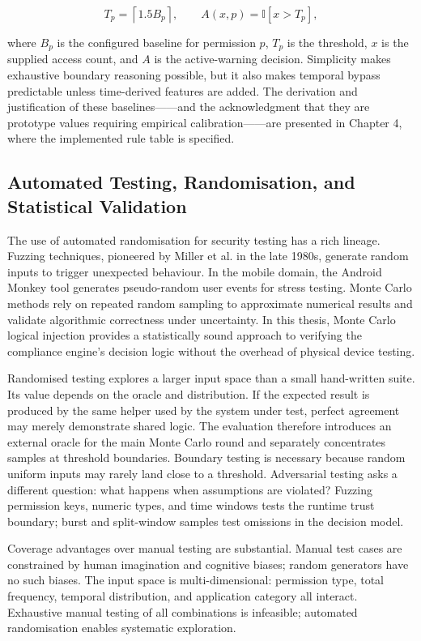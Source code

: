 \begin{equation}
T_p=\left\lceil 1.5B_p \right\rceil,\qquad
A(x,p)=\mathbb{I}[x>T_p],
\end{equation}

where $B_p$ is the configured baseline for permission $p$, $T_p$ is the threshold, $x$ is the supplied access count, and $A$ is the active-warning decision. Simplicity makes exhaustive boundary reasoning possible, but it also makes temporal bypass predictable unless time-derived features are added. The derivation and justification of these baselines——and the acknowledgment that they are prototype values requiring empirical calibration——are presented in Chapter 4, where the implemented rule table is specified.

\subsection{Automated Testing, Randomisation, and Statistical Validation}

The use of automated randomisation for security testing has a rich lineage. Fuzzing techniques, pioneered by Miller et al. in the late 1980s, generate random inputs to trigger unexpected behaviour. In the mobile domain, the Android Monkey tool generates pseudo-random user events for stress testing. Monte Carlo methods rely on repeated random sampling to approximate numerical results and validate algorithmic correctness under uncertainty. In this thesis, Monte Carlo logical injection provides a statistically sound approach to verifying the compliance engine's decision logic without the overhead of physical device testing.

Randomised testing explores a larger input space than a small hand-written suite. Its value depends on the oracle and distribution. If the expected result is produced by the same helper used by the system under test, perfect agreement may merely demonstrate shared logic. The evaluation therefore introduces an external oracle for the main Monte Carlo round and separately concentrates samples at threshold boundaries. Boundary testing is necessary because random uniform inputs may rarely land close to a threshold. Adversarial testing asks a different question: what happens when assumptions are violated? Fuzzing permission keys, numeric types, and time windows tests the runtime trust boundary; burst and split-window samples test omissions in the decision model.

Coverage advantages over manual testing are substantial. Manual test cases are constrained by human imagination and cognitive biases; random generators have no such biases. The input space is multi-dimensional: permission type, total frequency, temporal distribution, and application category all interact. Exhaustive manual testing of all combinations is infeasible; automated randomisation enables systematic exploration.

